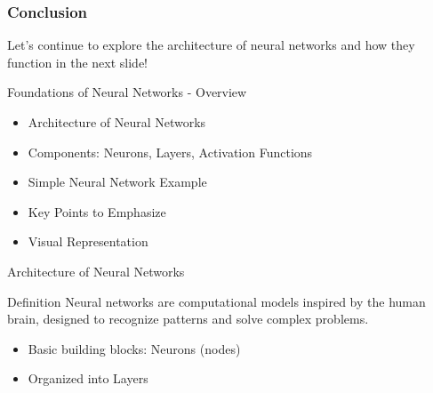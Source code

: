 \documentclass[aspectratio=169]{beamer}
\begin{document}
\begin{frame}[fragile]
    \frametitle{Conclusion}
    Let’s continue to explore the architecture of neural networks and how they function in the next slide!
\end{frame}

\begin{frame}[fragile]{Foundations of Neural Networks - Overview}
    \begin{itemize}
        \item Architecture of Neural Networks
        \item Components: Neurons, Layers, Activation Functions
        \item Simple Neural Network Example
        \item Key Points to Emphasize
        \item Visual Representation
    \end{itemize}
\end{frame}

\begin{frame}[fragile]{Architecture of Neural Networks}
    \begin{block}{Definition}
        Neural networks are computational models inspired by the human brain, designed to recognize patterns and solve complex problems.
    \end{block}
    \begin{itemize}
        \item Basic building blocks: Neurons (nodes)
        \item Organized into Layers
    \end{itemize}
\end{frame}
\end{document}
